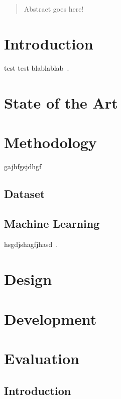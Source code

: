 \documentclass[11pt, a4paper]{report}
\begin{document}

\begin{abstract}
    Abstract goes here!
\end{abstract}

\tableofcontents
{}
\listoffigures
\listoftables
 
\newpage
 

\chapter{Introduction}

test test blablablab~\cite{Costa-Abreu:2019}.

\blindtext

\chapter{State of the Art}

\blindtext

\chapter{Methodology}

gajhfgsjdhgf

\section{Dataset}

\section{Machine Learning}


hsgdjshagfjhasd~\cite{Costa-Abreu:2019}.

\chapter{Design}


\chapter{Development}


\chapter{Evaluation}

\section{Introduction}
\end{document}
